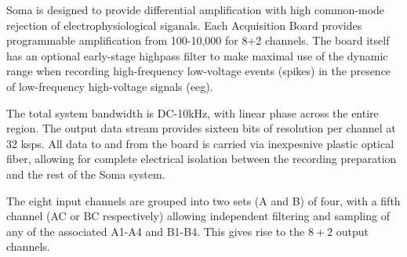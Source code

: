
Soma is designed to provide differential amplification with high
common-mode rejection of electrophysiological siganals. Each
Acquisition Board provides programmable amplification from 100-10,000
for 8+2 channels. The board itself has an optional early-stage
highpass filter to make maximal use of the dynamic range when
recording high-frequency low-voltage events (spikes) in the presence
of low-frequency high-voltage signals (eeg).


The total system bandwidth is DC-10kHz, with linear phase across the
entire region. The output data stream provides sixteen bits of
resolution per channel at 32 ksps. All data to and from the board is
carried via inexpesnive plastic optical fiber, allowing for complete
electrical isolation between the recording preparation and the rest of
the Soma system.

The eight input channels are grouped into two sets (A and B) of four,
with a fifth channel (AC or BC respectively) allowing independent
filtering and sampling of any of the associated A1-A4 and B1-B4. This
gives rise to the $8+2$ output channels.
